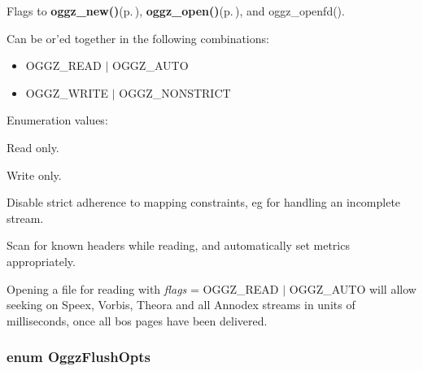 Flags to {\bf oggz\_\-new()}{\rm (p.\,\pageref{oggz_8h_a4})}, {\bf oggz\_\-open()}{\rm (p.\,\pageref{oggz_8h_a5})}, and oggz\_\-openfd(). 

Can be or'ed together in the following combinations:\begin{itemize}
\item OGGZ\_\-READ $|$ OGGZ\_\-AUTO\item OGGZ\_\-WRITE $|$ OGGZ\_\-NONSTRICT \end{itemize}
\begin{Desc}
\item[Enumeration values: ]\par
\begin{description}
\item[{\em 
OGGZ\_\-READ\label{oggz__constants_8h_a25a0}
}]Read only. \item[{\em 
OGGZ\_\-WRITE\label{oggz__constants_8h_a25a1}
}]Write only. \item[{\em 
OGGZ\_\-NONSTRICT\label{oggz__constants_8h_a25a2}
}]Disable strict adherence to mapping constraints, eg for handling an incomplete stream. \item[{\em 
OGGZ\_\-AUTO\label{oggz__constants_8h_a25a3}
}]Scan for known headers while reading, and automatically set metrics appropriately. 

Opening a file for reading with {\em flags\/} = OGGZ\_\-READ $|$ OGGZ\_\-AUTO will allow seeking on Speex, Vorbis, Theora and all Annodex streams in units of milliseconds, once all bos pages have been delivered. \end{description}
\end{Desc}

\subsubsection{\setlength{\rightskip}{0pt plus 5cm}enum {\bf Oggz\-Flush\-Opts}}\label{oggz__constants_8h_a26}


